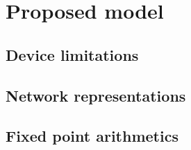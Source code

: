 \FloatBarrier
\chapter{Proposed model}

\FloatBarrier
\section{Device limitations}

\FloatBarrier
\section{Network representations}

\FloatBarrier
\section{Fixed point arithmetics}
